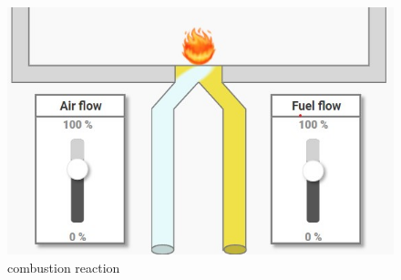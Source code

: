 \begin{figure}[htp]
    \centering
    \includegraphics[width=0.7\linewidth]{images/concept/elements/fuel_air_fire.jpg}
    \caption {combustion reaction}
\label{fig:appendix_combustion_reaction}
\end{figure}




